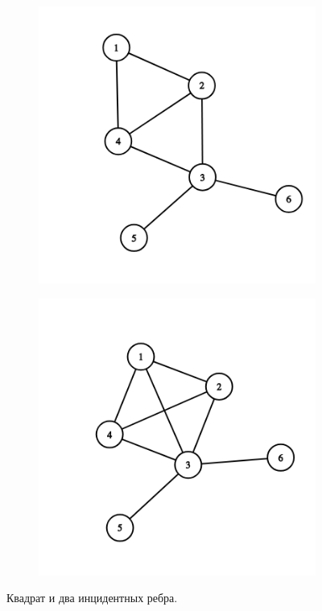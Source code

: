 \begin{solution}
\begin{figure}[H]
\begin{subfigure}[a]{0.24\linewidth}
  \end{subfigure}
  \begin{subfigure}[a]{0.24\linewidth}
    \includegraphics[width=\linewidth]{_img/344/10.png}
  \end{subfigure}
  \begin{subfigure}[a]{0.24\linewidth}
    \includegraphics[width=\linewidth]{_img/344/11.png}
  \end{subfigure}
  \caption{Квадрат и два инцидентных ребра.}
\end{figure}


\end{solution}
